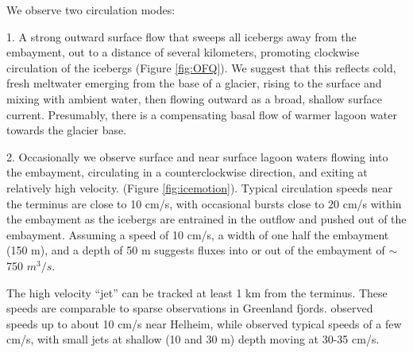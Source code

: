 We observe two circulation modes:

1. A strong outward surface flow that sweeps all icebergs away from the embayment, out to a distance of several kilometers, promoting clockwise circulation of the icebergs (Figure \ref{fig:OFQ}).  We suggest that this reflects cold, fresh meltwater emerging from the base of a glacier, rising to the surface and mixing with ambient water, then flowing outward as a broad, shallow surface current.  Presumably, there is a compensating basal flow of warmer lagoon water towards the glacier base.

2. Occasionally we observe surface and near surface lagoon waters flowing into the embayment, circulating in a counterclockwise direction, and exiting at relatively high velocity. (Figure \ref{fig:icemotion}).  Typical circulation speeds near the terminus are close to 10 cm/s, with occasional bursts close to 20 cm/s within the embayment as the icebergs are entrained in the outflow and pushed out of the embayment.  Assuming a speed of 10 cm/s, a width of one half the embayment (150 m), and a depth of 50 m suggests fluxes into or out of the embayment of $\sim$750 $m^3/s$.

The high velocity “jet” can be tracked at least 1 km from the terminus.  These speeds are comparable to sparse observations in Greenland fjords.  \citet{straneo2012characteristics} observed speeds up to about 10 cm/s near Helheim, while \citet{rignot2010rapid} observed typical speeds of a few cm/s, with small jets at shallow (10 and 30 m) depth moving at 30-35 cm/s. 


